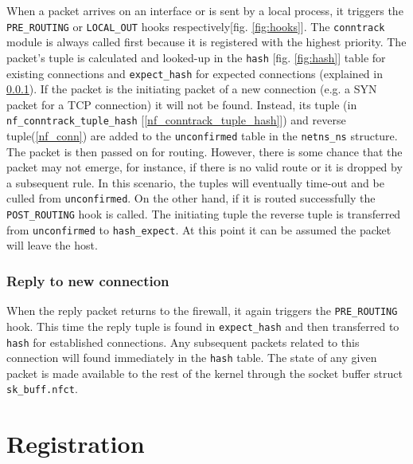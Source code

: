 \documentclass[a4paper,10pt]{article}
\newcommand{\figref}[1]{[fig. \ref{#1}]}
\newcommand{\cref}[1]{[\ref{#1}]}
\begin{document}
When a packet arrives on an interface or is sent by a local process,
it triggers the \verb|PRE_ROUTING| or \verb|LOCAL_OUT| hooks
respectively\figref{fig:hooks}. The \verb|conntrack| module is always called first
because it is registered with the highest priority. The packet's tuple
is calculated\cite{jhash} and looked-up in the \verb|hash| \figref{fig:hash} table
for existing connections and \verb|expect_hash| for expected
connections (explained in \ref{reply}). If the packet is the
initiating packet of a new connection (e.g. a SYN packet for a TCP
connection\cite{tcpip-illustrated}) it will not be found. Instead, its tuple (in
\verb|nf_conntrack_tuple_hash| \cref{nf_conntrack_tuple_hash}) and
reverse tuple(\ref{nf_conn}) are added to the \verb|unconfirmed| table
in the \verb|netns_ns| structure. The packet is then passed on for
routing. However, there is some chance that the packet may not emerge,
for instance, if there is no valid route or it is dropped by a
subsequent rule\cite{netfilter-internals}. In this scenario, the
tuples will eventually time-out and be culled from \verb|unconfirmed|.
On the other hand, if it is routed successfully the
\verb|POST_ROUTING| hook is called. The initiating tuple the reverse
tuple is transferred from \verb|unconfirmed| to \verb|hash_expect|. At
this point it can be assumed the packet will leave the host.

\subsubsection{Reply to new connection}\label{reply}
When the reply packet returns to the firewall, it again triggers the
\verb|PRE_ROUTING| hook. This time the reply tuple is found in
\verb|expect_hash| and then transferred to \verb|hash| for established
connections. Any subsequent packets related to this connection will
found immediately in the \verb|hash| table. The state of any given
packet is made available to the rest of the kernel through the socket buffer struct
\verb|sk_buff.nfct|.

\section{Registration}\label{registration}






\end{document}
